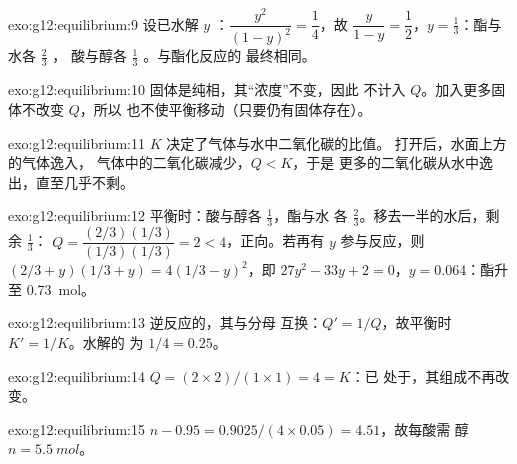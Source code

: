 \begin{solution}{exo:g12:equilibrium:9}
设已水解 $y$ ：$\dfrac{y^2}{(1-y)^2} = \dfrac{1}{4}$，故
$\dfrac{y}{1-y} = \dfrac{1}{2}$，$y = \frac{1}{3}$：酯与水各 $\frac{2}{3}$ ，
酸与醇各 $\frac{1}{3}$ 。与酯化反应的
最终相同。
\end{solution}

\begin{solution}{exo:g12:equilibrium:10}
固体是纯相，其“浓度”不变，因此
不计入 $Q$。加入更多固体不改变 $Q$，所以
也不使平衡移动（只要仍有固体存在）。
\end{solution}

\begin{solution}{exo:g12:equilibrium:11}
$K$ 决定了气体与水中二氧化碳的比值。
打开后，水面上方的气体逸入，
气体中的二氧化碳减少，$Q < K$，于是
更多的二氧化碳从水中逸出，直至几乎不剩。
\end{solution}

\begin{solution}{exo:g12:equilibrium:12}
平衡时：酸与醇各 $\frac{1}{3}$，酯与水
各 $\frac{2}{3}$。移去一半的水后，剩余 $\frac{1}{3}$：
$Q = \dfrac{(2/3)(1/3)}{(1/3)(1/3)} = 2 < 4$，正向。若再有 $y$ 
参与反应，则 $(2/3 + y)(1/3 + y) = 4(1/3 - y)^2$，即
$27y^2 - 33y + 2 = 0$，$y = 0.064$：酯升至 \qty{0.73}{mol}。
\end{solution}

\begin{solution}{exo:g12:equilibrium:13}
逆反应的，其与分母
互换：$Q' = 1/Q$，故平衡时 $K' = 1/K$。水解的
为 $1/4 = 0.25$。
\end{solution}

\begin{solution}{exo:g12:equilibrium:14}
$Q = (2 \times 2)/(1 \times 1) = 4 = K$：已
处于，其组成不再改变。
\end{solution}

\begin{solution}{exo:g12:equilibrium:15}
$n - 0.95 = 0.9025 / (4 \times 0.05) = 4.51$，故每酸需
醇 $n = \qty{5.5}{mol}$。
\end{solution}

